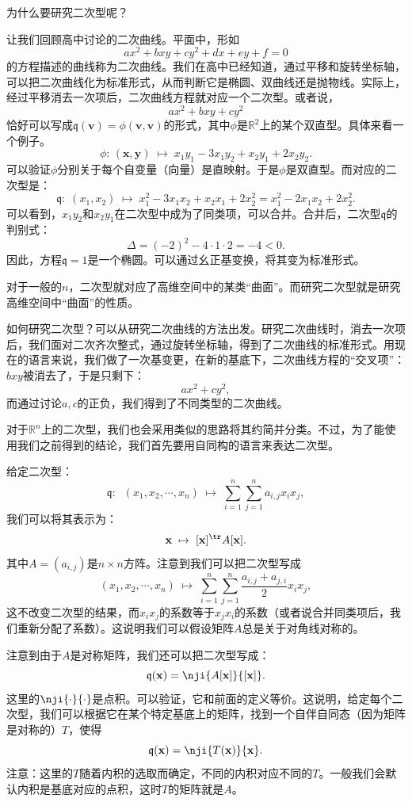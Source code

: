 \documentclass[12pt,UTF8]{ctexbook}
\begin{document}
为什么要研究二次型呢？

让我们回顾高中讨论的二次曲线。平面中，形如
$$ ax^2 + bxy + cy^2 + dx + ey + f = 0 $$
的方程描述的曲线称为二次曲线。我们在高中已经知道，通过平移和旋转坐标轴，可以把二次曲线化为标准形式，从而判断它是椭圆、双曲线还是抛物线。实际上，经过平移消去一次项后，二次曲线方程就对应一个二次型。或者说，
$$ ax^2 + bxy + cy^2 $$
恰好可以写成$\mathfrak{q}(\mathbf{v}) = \phi(\mathbf{v}, \mathbf{v})$的形式，其中$\phi$是$\mathbb{R}^2$上的某个双直型。具体来看一个例子。
$$\phi: \,( \mathbf{x}, \mathbf{y} ) \; \mapsto \; x_1y_1 - 3x_1y_2 + x_2y_1 + 2x_2y_2.
$$
可以验证$\phi$分别关于每个自变量（向量）是直映射。于是$\phi$是双直型。而对应的二次型是：
$$ \mathfrak{q}:\; (x_1, x_2) \; \mapsto \; x_1^2 - 3x_1x_2 + x_2x_1 + 2x_2^2 = x_1^2 - 2x_1x_2 + 2x_2^2.
$$
可以看到，$x_1y_2$和$x_2y_1$在二次型中成为了同类项，可以合并。合并后，二次型$\mathfrak{q}$的判别式：
$$
\Delta = (-2)^2 - 4\cdot 1\cdot 2 = -4 < 0.
$$
因此，方程$\mathfrak{q} = 1$是一个椭圆。可以通过幺正基变换，将其变为标准形式。

对于一般的$n$，二次型就对应了高维空间中的某类“曲面”。而研究二次型就是研究高维空间中“曲面”的性质。

如何研究二次型？可以从研究二次曲线的方法出发。研究二次曲线时，消去一次项后，我们面对二次齐次整式，通过旋转坐标轴，得到了二次曲线的标准形式。用现在的语言来说，我们做了一次基变更，在新的基底下，二次曲线方程的“交叉项”：$bxy$被消去了，于是只剩下：
$$ ax^2 + cy^2,$$
而通过讨论$a,c$的正负，我们得到了不同类型的二次曲线。

对于$\mathbb{R}^n$上的二次型，我们也会采用类似的思路将其约简并分类。不过，为了能使用我们之前得到的结论，我们首先要用自同构的语言来表达二次型。

给定二次型：
$$ \mathfrak{q}:\;\; (x_1, x_2, \cdots, x_n) \; \mapsto \; \sum_{i=1}^n \sum_{j=1}^n a_{i,j} x_i x_j, $$
我们可以将其表示为：
$$ \mathbf{x} \; \mapsto \; [\mathbf{x}]^{\tr} A [\mathbf{x}]. $$
其中$A = (a_{i,j})$是$n\times n$方阵。注意到我们可以把二次型写成
$$ (x_1, x_2, \cdots, x_n) \; \mapsto \; \sum_{i=1}^n \sum_{j=1}^n \frac{a_{i,j} + a_{j,i}}{2} x_i x_j, $$
这不改变二次型的结果，而$x_i x_j$的系数等于$x_j x_i$的系数（或者说合并同类项后，我们重新分配了系数）。这说明我们可以假设矩阵$A$总是关于对角线对称的。

注意到由于$A$是对称矩阵，我们还可以把二次型写成：
$$ \mathfrak{q}(\mathbf{x}) =  \nji{A[\mathbf{x}]}{[\mathbf{x}]}. $$
这里的$\nji{\cdot}{\cdot}$是点积。可以验证，它和前面的定义等价。这说明，给定每个二次型，我们可以根据它在某个特定基底上的矩阵，找到一个自伴自同态（因为矩阵是对称的）$T$，使得
$$ \mathfrak{q}(\mathbf{x}) = \nji{T(\mathbf{x})}{\mathbf{x}}. $$
注意：这里的$T$随着内积的选取而确定，不同的内积对应不同的$T$。一般我们会默认内积是基底对应的点积，这时$T$的矩阵就是$A$。
\end{document}
